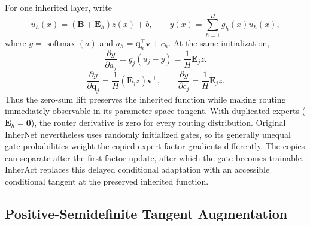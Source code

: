 \documentclass{article}
\newcommand{\bB}{\mathbf{B}}
\newcommand{\bE}{\mathbf{E}}
\begin{document}
For one inherited layer, write
\begin{equation}
  u_h(x)=(\bB+\bE_h)z(x)+b,\qquad
  y(x)=\sum_{h=1}^H g_h(x)u_h(x),
\end{equation}
where $g=\operatorname{softmax}(a)$ and
$a_h=\mathbf{q}_h^\top\mathbf{v}+c_h$.  At the same initialization,
\begin{equation}
  \frac{\partial y}{\partial a_j}
  =g_j(u_j-y)
  =\frac{1}{H}\bE_jz.
  \label{eq:router-gradient}
\end{equation}
\begin{equation}
  \frac{\partial y}{\partial\mathbf{q}_j}
  =\frac{1}{H}(\bE_jz)\mathbf{v}^\top,
  \qquad
  \frac{\partial y}{\partial c_j}=\frac{1}{H}\bE_jz.
\end{equation}
Thus the zero-sum lift preserves the inherited function while making routing
immediately observable in its parameter-space tangent.  With duplicated
experts ($\bE_h=\mathbf{0}$), the router derivative is zero for every routing
distribution.  Original InherNet nevertheless uses randomly initialized
gates, so its generally unequal gate probabilities weight the copied
expert-factor gradients differently.  The copies can separate after the first
factor update, after which the gate becomes trainable.  InherAct replaces this
delayed conditional adaptation with an accessible conditional tangent at the
preserved inherited function.

\subsection{Positive-Semidefinite Tangent Augmentation}
\end{document}
